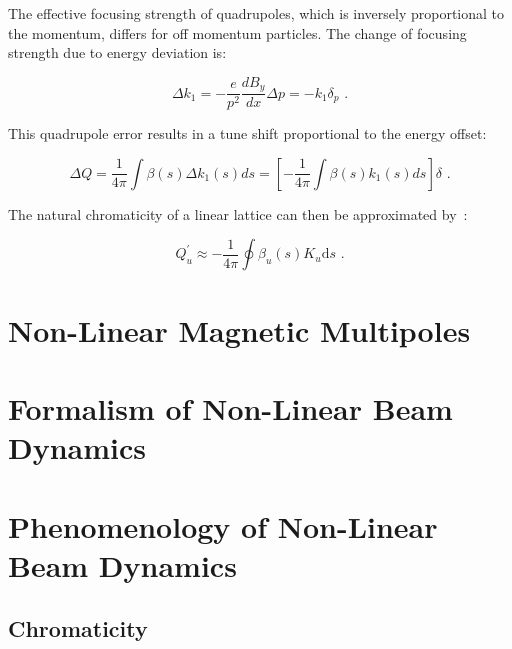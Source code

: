 The effective focusing strength of quadrupoles, which is inversely proportional to the momentum, differs for off momentum particles.
The change of focusing strength due to energy deviation is:

\begin{equation}
	\Delta k_{1} = - \dfrac{e}{p^2} \dfrac{d B_{y}}{d x} \Delta p = -k_{1} \delta_p \text{ .}
    \label{equation:quadrupole_focusing_strength_deviation_from_dispersion}
\end{equation}

This quadrupole error results in a tune shift proportional to the energy offset:

\begin{equation}
	\Delta Q = \dfrac{1}{4 \pi} \int \beta(s) \Delta k_{1}(s) ds = \left[ - \frac{1}{4 \pi} \int \beta(s) k_{1}(s) ds \right] \delta \text{ .}
    \label{equation:tune_shift_from_dispersion}
\end{equation}

The natural chromaticity of a linear lattice can then be approximated by~\cite{CAS:Guiducci:Chromaticity}:

\begin{equation}
    Q_u^{\prime} \approx -\frac{1}{4 \pi} \oint \beta_u(s) K_u \mathrm{d}s \text{ .}
    \label{equation:natural_chromaticity_approximation}
\end{equation}


\section{Non-Linear Magnetic Multipoles}


\section{Formalism of Non-Linear Beam Dynamics}


\section{Phenomenology of Non-Linear Beam Dynamics}

\subsection{Chromaticity}

